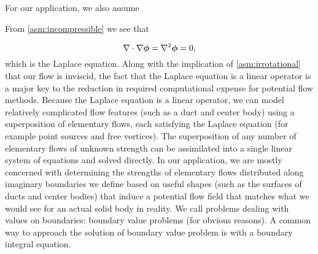 For our application, we also assume

\begin{assumption}{}
    \label{asm:incompressible}

    \vspace*{-\baselineskip}



\end{assumption}
%
From \cref{asm:incompressible} we see that

\begin{equation}
    \label{eqn:laplace}
    \nabla \cdot \nabla \bm{\phi} = \nabla^2 \bm{\phi} = 0,
\end{equation}
%
which is the Laplace equation.
%
Along with the implication of \cref{asm:irrotational} that our flow is inviscid, the fact that the Laplace equation is a linear operator is a major key to the reduction in required computational expense for potential flow methods.
%
Because the Laplace equation is a linear operator, we can model relatively complicated flow features (such as a duct and center body) using a superposition of elementary flows, each satisfying the Laplace equation (for example point sources and free vortices).
%
The superposition of any number of elementary flows of unknown strength can be assimilated into a single linear system of equations and solved directly.
%
In our application, we are mostly concerned with determining the strengths of elementary flows distributed along imaginary boundaries we define based on useful shapes (such as the surfaces of ducts and center bodies) that induce a potential flow field that matches what we would see for an actual solid body in reality.
%
We call problems dealing with values on boundaries: boundary value problems (for obvious reasons).
%
A common way to approach the solution of boundary value problem is with a boundary integral equation.




